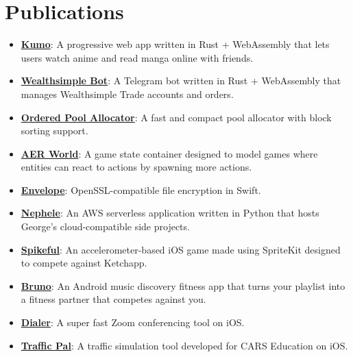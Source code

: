 \documentclass{article}
\newcommand{\resumeItem}[2]{
  \item\small{
    \textbf{#1}{: #2\vspace{-2pt}}
  }
}
\newcommand{\resumeSubItem}[2]{\resumeItem{#1}{#2}\vspace{-4pt}}
\newcommand{\resumeSubHeadingListStart}{\begin{itemize}[leftmargin=*]}
\newcommand{\resumeSubHeadingListEnd}{\end{itemize}}
\begin{document}
\section{Publications}
  \resumeSubHeadingListStart{}
    \resumeSubItem{\href{https://www.kumo.tk}{Kumo}}
      {A progressive web app written in Rust + WebAssembly that lets users watch anime and read manga online with friends.}
    \resumeSubItem{\href{https://t.me/WealthsimpleBot}{Wealthsimple Bot}}
      {A Telegram bot written in Rust + WebAssembly that manages Wealthsimple Trade accounts and orders.}
    \resumeSubItem{\href{https://crates.io/crates/ordered-pool-allocator}{Ordered Pool Allocator}}
      {A fast and compact pool allocator with block sorting support.}
    \resumeSubItem{\href{https://github.com/george-lim/aer-world}{AER World}}
      {A game state container designed to model games where entities can react to actions by spawning more actions.}
    \resumeSubItem{\href{https://cocoapods.org/pods/envelope}{Envelope}}
      {OpenSSL-compatible file encryption in Swift.}
    \resumeSubItem{\href{https://github.com/george-lim/nephele}{Nephele}}
      {An AWS serverless application written in Python that hosts George's cloud-compatible side projects.}
    \resumeSubItem{\href{https://appadvice.com/app/spikeful/1265332106}{Spikeful}}
      {An accelerometer-based iOS game made using SpriteKit designed to compete against Ketchapp.}
    \resumeSubItem{\href{https://play.google.com/store/apps/details?id=com.bruno.android}{Bruno}}
      {An Android music discovery fitness app that turns your playlist into a fitness partner that competes against you.}
    \resumeSubItem{\href{https://appadvice.com/app/dialer/1266511331}{Dialer}}
      {A super fast Zoom conferencing tool on iOS.}
    \resumeSubItem{\href{https://appadvice.com/app/traffic-pal/1265505042}{Traffic Pal}}
      {A traffic simulation tool developed for CARS Education on iOS.}
  \resumeSubHeadingListEnd{}
\end{document}
